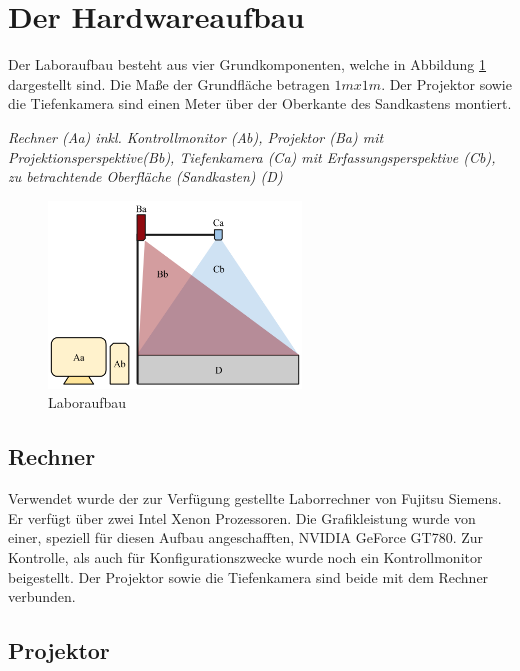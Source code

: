 \section{Der Hardwareaufbau}
\begin{Spacing}{\mylinespace}

Der Laboraufbau besteht aus vier Grundkomponenten, welche in Abbildung \ref{fig:labor} dargestellt sind. Die Maße der Grundfläche betragen $1m x 1m$. Der Projektor sowie die Tiefenkamera sind einen Meter über der Oberkante des Sandkastens montiert.

\vspace{0.2cm}
\textit{Rechner (Aa) inkl. Kontrollmonitor (Ab), Projektor (Ba) mit Projektionsperspektive(Bb), Tiefenkamera (Ca) mit Erfassungsperspektive (Cb), zu betrachtende Oberfläche (Sandkasten) (D)}

\begin{figure}[hbtp]
	\centering
	\includegraphics[width=0.6\textwidth]{graphics/Aufbau.png}
	\caption{Laboraufbau}
	\label{fig:labor}
\end{figure}

\subsection{Rechner}

Verwendet wurde der zur Verfügung gestellte Laborrechner von Fujitsu Siemens. Er verfügt über zwei Intel Xenon Prozessoren. Die Grafikleistung wurde von einer, speziell für diesen Aufbau angeschafften, NVIDIA GeForce GT780. Zur Kontrolle, als auch für Konfigurationszwecke wurde noch ein Kontrollmonitor beigestellt. Der Projektor sowie die Tiefenkamera sind beide mit dem Rechner verbunden.

\subsection{Projektor}


\end{Spacing}

